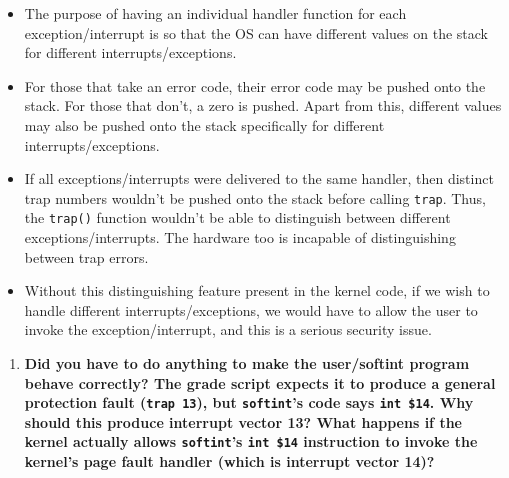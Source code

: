 \documentclass[]{article}
\begin{document}
\begin{itemize}
\itemsep1pt\parskip0pt
\item
  The purpose of having an individual handler function for each
  exception/interrupt is so that the OS can have different values on the
  stack for different interrupts/exceptions.
\item
  For those that take an error code, their error code may be pushed onto
  the stack. For those that don't, a zero is pushed. Apart from this,
  different values may also be pushed onto the stack specifically for
  different interrupts/exceptions.
\item
  If all exceptions/interrupts were delivered to the same handler, then
  distinct trap numbers wouldn't be pushed onto the stack before calling
  \texttt{trap}. Thus, the \texttt{trap()} function wouldn't be able to
  distinguish between different exceptions/interrupts. The hardware too
  is incapable of distinguishing between trap errors.
\item
  Without this distinguishing feature present in the kernel code, if we
  wish to handle different interrupts/exceptions, we would have to allow
  the user to invoke the exception/interrupt, and this is a serious
  security issue.
\end{itemize}

\begin{enumerate}
\def\labelenumi{\arabic{enumi}.}
\setcounter{enumi}{1}
\itemsep1pt\parskip0pt
\item
  \textbf{Did you have to do anything to make the user/softint program
  behave correctly? The grade script expects it to produce a general
  protection fault (\texttt{trap 13}), but \texttt{softint}'s code says
  \texttt{int \$14}. Why should this produce interrupt vector 13? What
  happens if the kernel actually allows \texttt{softint}'s
  \texttt{int \$14} instruction to invoke the kernel's page fault
  handler (which is interrupt vector 14)?}
\end{enumerate}
\end{document}
